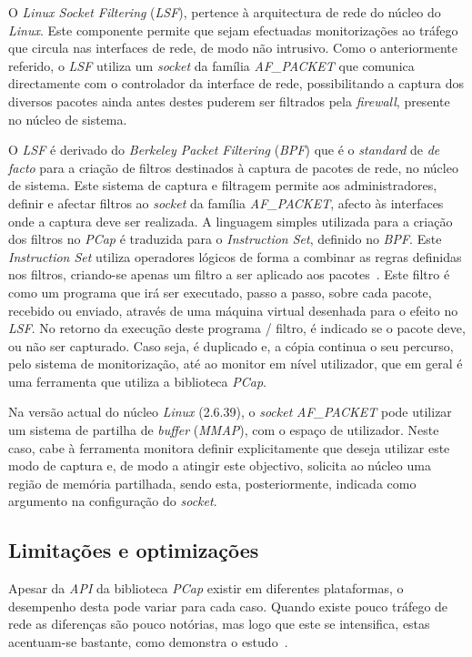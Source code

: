 O \textit{Linux Socket Filtering} (\textit{LSF}), pertence à arquitectura de rede do núcleo do \textit{Linux}.
Este componente permite que sejam efectuadas monitorizações ao tráfego que circula nas interfaces de rede, de modo não intrusivo.
Como o anteriormente referido, o \textit{LSF} utiliza um \textit{socket} da família \textit{AF\_PACKET} que comunica directamente com o controlador da interface de rede, possibilitando a captura dos diversos pacotes ainda antes destes puderem ser filtrados pela \textit{firewall}, presente no núcleo de sistema.

O \textit{LSF} é derivado do \textit{Berkeley Packet Filtering} (\textit{BPF}) que é o \textit{standard} de \textit{de facto} para a criação de filtros destinados à captura de pacotes de rede, no núcleo de sistema.
Este sistema de captura e filtragem permite aos administradores, definir e afectar filtros ao \textit{socket} da família \textit{AF\_PACKET}, afecto às interfaces onde a captura deve ser realizada.
A linguagem simples utilizada para a criação dos filtros no \textit{PCap} é traduzida para o \textit{Instruction Set}, definido no \textit{BPF}.
Este \textit{Instruction Set} utiliza operadores lógicos de forma a combinar as regras definidas nos filtros, criando-se apenas um filtro a ser aplicado aos pacotes~\cite{Mccanne92thebsd}.
Este filtro é como um programa que irá ser executado, passo a passo, sobre cada pacote, recebido ou enviado, através de uma máquina virtual desenhada para o efeito no \textit{LSF}.
No retorno da execução deste programa / filtro, é indicado se o pacote deve, ou não ser capturado.
Caso seja, é duplicado e, a cópia continua o seu percurso, pelo sistema de monitorização, até ao monitor em nível utilizador, que em geral é uma ferramenta que utiliza a biblioteca \textit{PCap}.

Na versão actual do núcleo \textit{Linux} (2.6.39), o \textit{socket} \textit{AF\_PACKET} pode utilizar um sistema de partilha de \textit{buffer} (\textit{MMAP}), com o espaço de utilizador.
Neste caso, cabe à ferramenta monitora definir explicitamente que deseja utilizar este modo de captura e, de modo a atingir este objectivo, solicita ao núcleo uma região de memória partilhada, sendo esta, posteriormente, indicada como argumento na configuração do \textit{socket}.



\subsection{Limitações e optimizações}
Apesar da \textit{API} da biblioteca \textit{PCap} existir em diferentes plataformas, o desempenho desta pode variar para cada caso.
Quando existe pouco tráfego de rede as diferenças são pouco notórias, mas logo que este se intensifica, estas acentuam-se bastante, como demonstra o estudo~\cite{Deri2004}.

